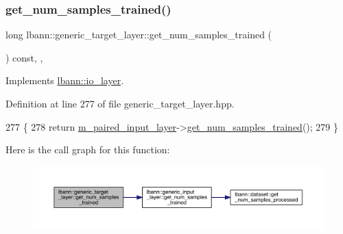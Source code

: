 \subsubsection{\texorpdfstring{get\+\_\+num\+\_\+samples\+\_\+trained()}{get\_num\_samples\_trained()}}
{\footnotesize\ttfamily long lbann\+::generic\+\_\+target\+\_\+layer\+::get\+\_\+num\+\_\+samples\+\_\+trained (\begin{DoxyParamCaption}{ }\end{DoxyParamCaption}) const\hspace{0.3cm}{\ttfamily [inline]}, {\ttfamily [override]}, {\ttfamily [virtual]}}



Implements \hyperlink{classlbann_1_1io__layer_ad25bf7559a27065c39d0c1d2f849347f}{lbann\+::io\+\_\+layer}.



Definition at line 277 of file generic\+\_\+target\+\_\+layer.\+hpp.


\begin{DoxyCode}
277                                                 \{
278     \textcolor{keywordflow}{return} \hyperlink{classlbann_1_1generic__target__layer_a84da1260e9feb4fbc3e6f2315e4cab4b}{m\_paired\_input\_layer}->\hyperlink{classlbann_1_1generic__input__layer_a95a7a5ad2a6089ffb9197632015e6062}{get\_num\_samples\_trained}();
279   \}
\end{DoxyCode}
Here is the call graph for this function\+:\nopagebreak
\begin{figure}[H]
\begin{center}
\leavevmode
\includegraphics[width=350pt]{classlbann_1_1generic__target__layer_abff09be96adbd480f35fcfba3c6cfc5a_cgraph}
\end{center}
\end{figure}
\mbox{\label{classlbann_1_1generic__target__layer_a4ffc26f13661686fdf7f8482beef79d4}} 

